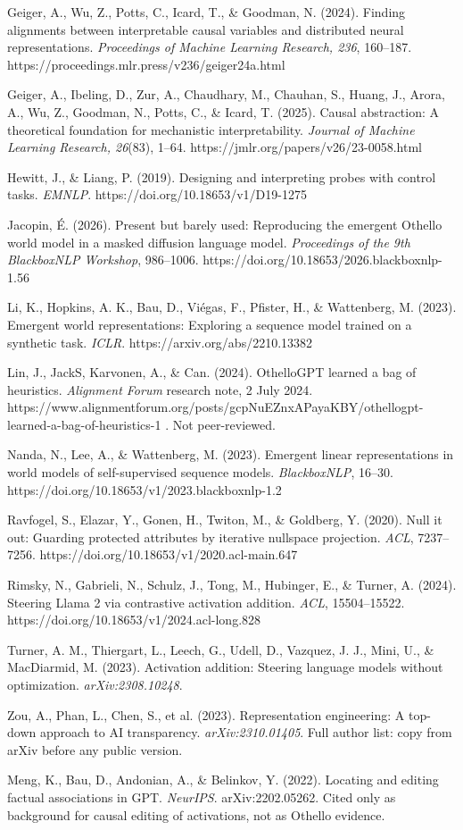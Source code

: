 \documentclass[11pt]{article}
\begin{document}
Geiger, A., Wu, Z., Potts, C., Icard, T., \& Goodman, N. (2024). Finding alignments between interpretable causal variables and distributed neural representations. \emph{Proceedings of Machine Learning Research, 236}, 160--187. https://proceedings.mlr.press/v236/geiger24a.html

Geiger, A., Ibeling, D., Zur, A., Chaudhary, M., Chauhan, S., Huang, J., Arora, A., Wu, Z., Goodman, N., Potts, C., \& Icard, T. (2025). Causal abstraction: A theoretical foundation for mechanistic interpretability. \emph{Journal of Machine Learning Research, 26}(83), 1--64. https://jmlr.org/papers/v26/23-0058.html

Hewitt, J., \& Liang, P. (2019). Designing and interpreting probes with control tasks. \emph{EMNLP}. https://doi.org/10.18653/v1/D19-1275

Jacopin, É. (2026). Present but barely used: Reproducing the emergent Othello world model in a masked diffusion language model. \emph{Proceedings of the 9th BlackboxNLP Workshop}, 986--1006. https://doi.org/10.18653/2026.blackboxnlp-1.56

Li, K., Hopkins, A. K., Bau, D., Viégas, F., Pfister, H., \& Wattenberg, M. (2023). Emergent world representations: Exploring a sequence model trained on a synthetic task. \emph{ICLR}. https://arxiv.org/abs/2210.13382

Lin, J., JackS, Karvonen, A., \& Can. (2024). OthelloGPT learned a bag of heuristics. \emph{Alignment Forum} research note, 2 July 2024. https://www.alignmentforum.org/posts/gcpNuEZnxAPayaKBY/othellogpt-learned-a-bag-of-heuristics-1 . Not peer-reviewed.

Nanda, N., Lee, A., \& Wattenberg, M. (2023). Emergent linear representations in world models of self-supervised sequence models. \emph{BlackboxNLP}, 16--30. https://doi.org/10.18653/v1/2023.blackboxnlp-1.2

Ravfogel, S., Elazar, Y., Gonen, H., Twiton, M., \& Goldberg, Y. (2020). Null it out: Guarding protected attributes by iterative nullspace projection. \emph{ACL}, 7237--7256. https://doi.org/10.18653/v1/2020.acl-main.647

Rimsky, N., Gabrieli, N., Schulz, J., Tong, M., Hubinger, E., \& Turner, A. (2024). Steering Llama 2 via contrastive activation addition. \emph{ACL}, 15504--15522. https://doi.org/10.18653/v1/2024.acl-long.828

Turner, A. M., Thiergart, L., Leech, G., Udell, D., Vazquez, J. J., Mini, U., \& MacDiarmid, M. (2023). Activation addition: Steering language models without optimization. \emph{arXiv:2308.10248}.

Zou, A., Phan, L., Chen, S., et al. (2023). Representation engineering: A top-down approach to AI transparency. \emph{arXiv:2310.01405}. Full author list: copy from arXiv before any public version.

Meng, K., Bau, D., Andonian, A., \& Belinkov, Y. (2022). Locating and editing factual associations in GPT. \emph{NeurIPS}. arXiv:2202.05262. Cited only as background for causal editing of activations, not as Othello evidence.
\end{document}
